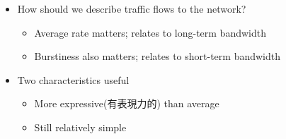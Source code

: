 \documentclass[12pt]{ctexart}   %
\begin{document}
\begin{itemize}
		 \item How should we describe traffic flows to the network?
		 \begin{itemize}
		 	\item Average rate matters; relates to long-term bandwidth
		 	\item Burstiness also matters; relates to short-term bandwidth
		 \end{itemize}
		 
		 \item Two characteristics useful
		 \begin{itemize}
		 	\item More expressive(有表現力的) than average
		 	\item Still relatively simple
		 \end{itemize}
	\end{itemize}
	
\end{document}

